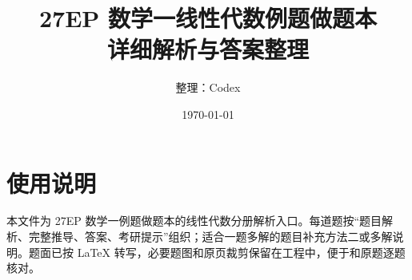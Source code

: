 \documentclass[UTF8,12pt,a4paper]{ctexbook}
\title{27EP 数学一线性代数例题做题本\\详细解析与答案整理}
\author{整理：Codex}
\date{\today}
\begin{document}
\maketitle
\tableofcontents

\chapter*{使用说明}
本文件为 27EP 数学一例题做题本的线性代数分册解析入口。每道题按“题目解析、完整推导、答案、考研提示”组织；适合一题多解的题目补充方法二或多解说明。题面已按 LaTeX 转写，必要题图和原页裁剪保留在工程中，便于和原题逐题核对。





\end{document}

